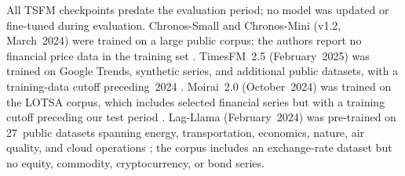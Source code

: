 \documentclass[preprint,11pt,authoryear]{elsarticle}
\newcommand{\1}{\boldsymbol{1}}
\begin{document}
	All TSFM checkpoints predate the evaluation period;
	no model was updated or fine-tuned during evaluation.
	Chronos-Small and Chronos-Mini
	(v1.2, March~2024) were trained on a large public
	corpus; the authors report no financial price data
	in the training set \citep{ansari2024chronos}.
	TimesFM~2.5 (February~2025) was trained on Google
	Trends, synthetic series, and additional public
	datasets, with a training-data cutoff preceding~2024
	\citep{das2024timesfm}. Moirai~2.0 (October~2024)
	was trained on the LOTSA corpus, which includes
	selected financial series but with a training cutoff
	preceding our test period
	\citep{woo2024moirai,liu2024moirai2}.
	Lag-Llama (February~2024) was pre-trained on
	27~public datasets spanning energy, transportation,
	economics, nature, air quality, and cloud operations
	\citep{rasul2024lagllama}; the corpus includes an
	exchange-rate dataset but no equity, commodity,
	cryptocurrency, or bond series.
	
\end{document}
